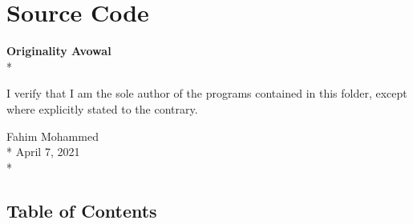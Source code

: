 \chapter{Source Code}

\thispagestyle{empty}
\begin{center}
    \textbf{Originality Avowal}\\*
    \begin{flushleft}
        I verify that I am the sole author of the programs contained in this folder, except where explicitly stated to the contrary. \\
    \end{flushleft}
    \begin{flushright}
        \normalsize{Fahim Mohammed}\\*
        \normalsize{April 7, 2021}\\*
    \end{flushright}
\end{center}

\section{Table of Contents}


